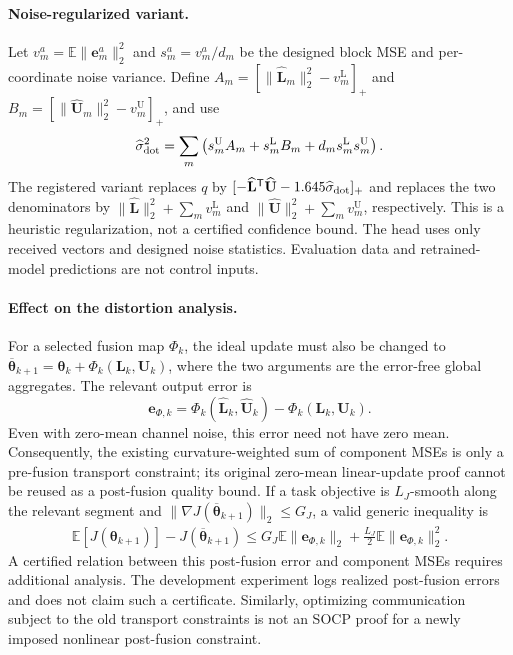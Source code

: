 \paragraph{Noise-regularized variant.}
Let $v_m^a=\mathbb E\|\mathbf e_m^a\|_2^2$ and
$s_m^a=v_m^a/d_m$ be the designed block MSE and per-coordinate noise
variance. Define $A_m=[\|\widehat{\mathbf L}_m\|_2^2-v_m^{\mathrm L}]_+$
and $B_m=[\|\widehat{\mathbf U}_m\|_2^2-v_m^{\mathrm U}]_+$, and use
\begin{equation}
\widehat\sigma_{\rm dot}^2=
\sum_m\left(s_m^{\mathrm U}A_m+s_m^{\mathrm L}B_m
+d_ms_m^{\mathrm L}s_m^{\mathrm U}\right).
\end{equation}
The registered variant replaces $q$ by
$[-\widehat{\mathbf L}^{\mathsf T}\widehat{\mathbf U}
-1.645\widehat\sigma_{\rm dot}]_+$ and replaces the two denominators
by $\|\widehat{\mathbf L}\|_2^2+\sum_m v_m^{\mathrm L}$ and
$\|\widehat{\mathbf U}\|_2^2+\sum_m v_m^{\mathrm U}$, respectively.
This is a heuristic regularization, not a certified confidence bound.
The head uses only received vectors and designed noise statistics.
Evaluation data and retrained-model predictions are not control inputs.

\paragraph{Effect on the distortion analysis.}
For a selected fusion map $\Phi_k$, the ideal update must also be changed
to $\overline{\boldsymbol\theta}_{k+1}=\boldsymbol\theta_k+
\Phi_k(\mathbf L_k,\mathbf U_k)$, where the two arguments are the
error-free global aggregates. The relevant output error is
\begin{equation}
\mathbf e_{\Phi,k}=\Phi_k(\widehat{\mathbf L}_k,
\widehat{\mathbf U}_k)-\Phi_k(\mathbf L_k,\mathbf U_k).
\end{equation}
Even with zero-mean channel noise, this error need not have zero mean.
Consequently, the existing curvature-weighted sum of component MSEs is
only a pre-fusion transport constraint; its original zero-mean
linear-update proof cannot be reused as a post-fusion quality bound.
If a task objective is $L_J$-smooth along the relevant segment and
$\|\nabla J(\overline{\boldsymbol\theta}_{k+1})\|_2\leq G_J$, a valid
generic inequality is
\begin{equation}
\begin{aligned}
\mathbb E[J(\boldsymbol\theta_{k+1})]
-J(\overline{\boldsymbol\theta}_{k+1})
\leq G_J\mathbb E\|\mathbf e_{\Phi,k}\|_2
+\frac{L_J}{2}\mathbb E\|\mathbf e_{\Phi,k}\|_2^2.
\end{aligned}
\end{equation}
A certified relation between this post-fusion error and component MSEs
requires additional analysis. The development experiment logs realized
post-fusion errors and does not claim such a certificate. Similarly,
optimizing communication subject to the old transport constraints is not
an SOCP proof for a newly imposed nonlinear post-fusion constraint.

